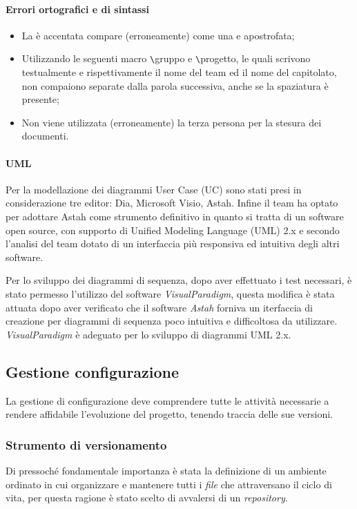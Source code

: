 \paragraph{Errori ortografici e di sintassi}
\begin{itemize}
\item La è accentata compare (erroneamente) come una e apostrofata;
\item Utilizzando le seguenti macro \verb+\+gruppo e \verb+\+progetto, le quali scrivono testualmente e rispettivamente il nome del team ed il nome del capitolato, non compaiono separate dalla parola successiva, anche se la spaziatura è presente;
\item Non viene utilizzata (erroneamente) la terza persona per la stesura dei documenti.
\end{itemize}
\paragraph{UML}
Per la modellazione dei diagrammi User Case (UC) sono stati presi in considerazione tre editor: Dia, Microsoft Visio, Astah. Infine il team ha optato per adottare Astah come strumento definitivo in quanto si tratta di un software open source, con supporto di Unified Modeling Language (UML) 2.x  e secondo l'analisi del team dotato di un interfaccia più responsiva ed intuitiva degli altri software.

Per lo sviluppo dei diagrammi di sequenza, dopo aver effettuato i test necessari, è stato permesso l'utilizzo del software \textit{VisualParadigm}, questa modifica è stata attuata dopo aver verificato che il software \textit{Astah} forniva un iterfaccia di creazione per diagrammi di sequenza poco intuitiva e difficoltosa da utilizzare. \textit{VisualParadigm} è adeguato per lo sviluppo di diagrammi UML 2.x.

\subsection{Gestione configurazione}
La gestione di configurazione deve comprendere tutte le attività necessarie a rendere affidabile l'evoluzione del progetto,
tenendo traccia delle sue versioni.
\subsubsection{Strumento di versionamento}
Di pressoché fondamentale importanza è stata la definizione di un ambiente ordinato in cui organizzare e mantenere tutti i \textit{file} che attraversano il ciclo di vita, per questa ragione è stato scelto di avvalersi di un \textit{repository}. 

